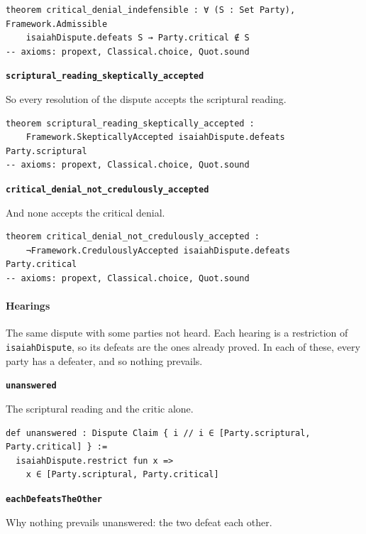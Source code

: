 \documentclass[11pt]{article}
\begin{document}
{\small\begin{verbatim}
theorem critical_denial_indefensible : ∀ (S : Set Party), Framework.Admissible
    isaiahDispute.defeats S → Party.critical ∉ S
-- axioms: propext, Classical.choice, Quot.sound
\end{verbatim}}
\par\medskip\noindent\textbf{\texttt{scriptural\_\allowbreak{}reading\_\allowbreak{}skeptically\_\allowbreak{}accepted}}\par\nobreak\noindent
So every resolution of the dispute accepts the scriptural reading.

{\small\begin{verbatim}
theorem scriptural_reading_skeptically_accepted :
    Framework.SkepticallyAccepted isaiahDispute.defeats Party.scriptural
-- axioms: propext, Classical.choice, Quot.sound
\end{verbatim}}
\par\medskip\noindent\textbf{\texttt{critical\_\allowbreak{}denial\_\allowbreak{}not\_\allowbreak{}credulously\_\allowbreak{}accepted}}\par\nobreak\noindent
And none accepts the critical denial.

{\small\begin{verbatim}
theorem critical_denial_not_credulously_accepted :
    ¬Framework.CredulouslyAccepted isaiahDispute.defeats Party.critical
-- axioms: propext, Classical.choice, Quot.sound
\end{verbatim}}
\paragraph*{Hearings}
\leavevmode\par\nobreak
The same dispute with some parties not heard. Each hearing is a restriction of \texttt{isaiah\allowbreak{}Dispute}, so its defeats are the ones already proved. In each of these, every party has a defeater, and so nothing prevails.

\par\medskip\noindent\textbf{\texttt{unanswered}}\par\nobreak\noindent
The scriptural reading and the critic alone.

{\small\begin{verbatim}
def unanswered : Dispute Claim { i // i ∈ [Party.scriptural, Party.critical] } :=
  isaiahDispute.restrict fun x =>
    x ∈ [Party.scriptural, Party.critical]
\end{verbatim}}
\par\medskip\noindent\textbf{\texttt{each\allowbreak{}Defeats\allowbreak{}The\allowbreak{}Other}}\par\nobreak\noindent
Why nothing prevails unanswered: the two defeat each other.
\end{document}
